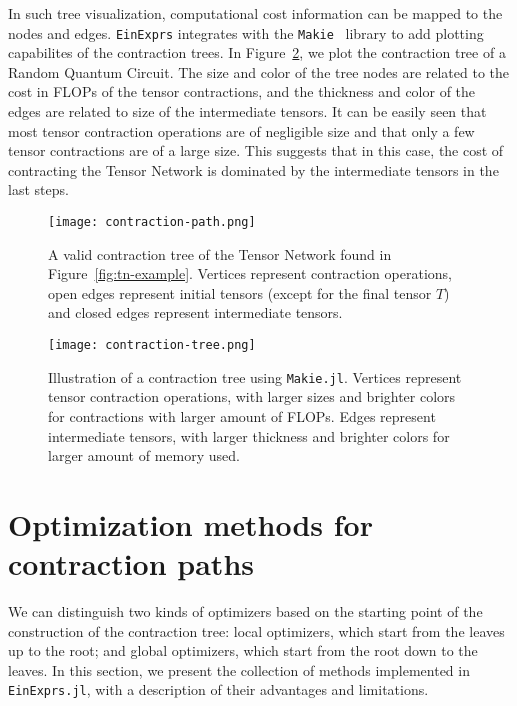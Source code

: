 \documentclass{juliacon}
\begin{document}
In such tree visualization, computational cost information can be mapped to the nodes and edges. 
\texttt{EinExprs} integrates with the \texttt{Makie}~\cite{DanischKrumbiegel2021} library to add plotting capabilites of the contraction trees.
In Figure~\ref{fig:contraction-tree:makie}, we plot the contraction tree of a Random Quantum Circuit.
The size and color of the tree nodes are related to the cost in FLOPs of the tensor contractions, and the thickness and color of the edges are related to size of the intermediate tensors.
It can be easily seen that most tensor contraction operations are of negligible size and that only a few tensor contractions are of a large size.
This suggests that in this case, the cost of contracting the Tensor Network is dominated by the intermediate tensors in the last steps.

\begin{figure}
    \centering
    \texttt{[image: contraction-path.png]}
    \caption{A valid contraction tree of the Tensor Network found in Figure~\ref{fig:tn-example}. Vertices represent contraction operations, open edges represent initial tensors (except for the final tensor $T$) and closed edges represent intermediate tensors.}
    \label{fig:contraction-tree}
\end{figure}

\begin{figure}
    \centering
    \texttt{[image: contraction-tree.png]}
    \caption{Illustration of a contraction tree using \texttt{Makie.jl}. Vertices represent tensor contraction operations, with larger sizes and brighter colors for contractions with larger amount of FLOPs. Edges represent intermediate tensors, with larger thickness and brighter colors for larger amount of memory used.}
    \label{fig:contraction-tree:makie}
\end{figure}

\section{Optimization methods for contraction paths}\label{sec:optimization-methods}

We can distinguish two kinds of optimizers based on the starting point of the construction of the contraction tree: local optimizers, which start from the leaves up to the root; and global optimizers, which start from the root down to the leaves. In this section, we present the collection of methods implemented in \texttt{EinExprs.jl}, with a description of their advantages and limitations.
\end{document}
